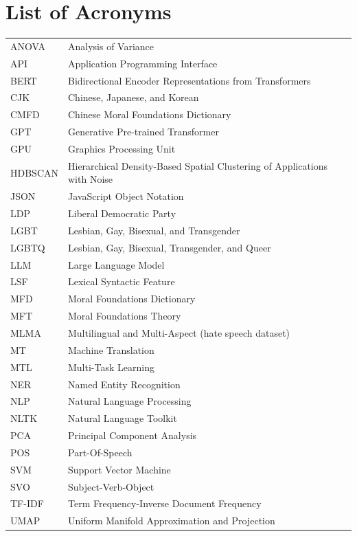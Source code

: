 
\chapter*{List of Acronyms}


\begin{tabular}{lp{12.5cm}}
ANOVA  & Analysis of Variance\\
API    & Application Programming Interface\\
BERT   & Bidirectional Encoder Representations from Transformers\\
CJK    & Chinese, Japanese, and Korean\\
CMFD   & Chinese Moral Foundations Dictionary\\
GPT    & Generative Pre-trained Transformer\\
GPU    & Graphics Processing Unit\\
HDBSCAN & Hierarchical Density-Based Spatial Clustering of Applications with Noise\\
JSON   & JavaScript Object Notation\\
LDP    & Liberal Democratic Party\\
LGBT   & Lesbian, Gay, Bisexual, and Transgender\\
LGBTQ  & Lesbian, Gay, Bisexual, Transgender, and Queer\\
LLM    & Large Language Model\\
LSF    & Lexical Syntactic Feature\\
MFD    & Moral Foundations Dictionary\\
MFT    & Moral Foundations Theory\\
MLMA   & Multilingual and Multi-Aspect (hate speech dataset)\\
MT     & Machine Translation\\
MTL    & Multi-Task Learning\\
NER    & Named Entity Recognition\\
NLP    & Natural Language Processing\\
NLTK   & Natural Language Toolkit\\
PCA    & Principal Component Analysis\\
POS    & Part-Of-Speech\\
SVM    & Support Vector Machine\\
SVO    & Subject-Verb-Object\\
TF-IDF & Term Frequency-Inverse Document Frequency\\
UMAP   & Uniform Manifold Approximation and Projection\\

\end{tabular}
